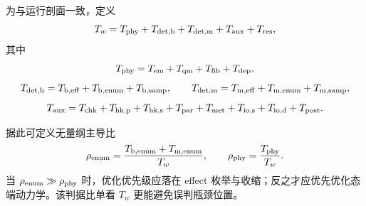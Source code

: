 为与运行剖面一致，定义
\begin{equation}
T_w=T_{\rm phy}+T_{\rm det,b}+T_{\rm det,m}+T_{\rm aux}+T_{\rm res},
\label{eq:app-time-closure}
\end{equation}
其中
\begin{equation}
T_{\rm phy}=T_{\rm em}+T_{\rm qm}+T_{\rm fib}+T_{\rm dep},
\end{equation}
\begin{equation}
T_{\rm det,b}=T_{\rm b,eff}+T_{\rm b,enum}+T_{\rm b,samp},\qquad
T_{\rm det,m}=T_{\rm m,eff}+T_{\rm m,enum}+T_{\rm m,samp},
\end{equation}
\begin{equation}
T_{\rm aux}=T_{\rm chk}+T_{\rm hk,p}+T_{\rm hk,s}+T_{\rm par}+T_{\rm met}+T_{\rm io,s}+T_{\rm io,d}+T_{\rm post}.
\end{equation}

据此可定义无量纲主导比
\begin{equation}
\rho_{\rm enum}=\frac{T_{\rm b,enum}+T_{\rm m,enum}}{T_w},\qquad
\rho_{\rm phy}=\frac{T_{\rm phy}}{T_w}.
\end{equation}
当 $\rho_{\rm enum}\gg \rho_{\rm phy}$ 时，优化优先级应落在 effect 枚举与收缩；反之才应优先优化态端动力学。该判据比单看 $T_w$ 更能避免误判瓶颈位置。

